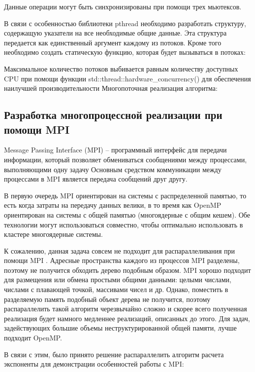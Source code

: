 \documentclass[14pt,a4paper,report]{report}
\begin{document}
Данные операции могут быть синхронизированы при помощи трех мьютексов.

В связи с особенностью библиотеки pthread необходимо разработать структуру, содержащую указатели на все необходимые общие данные. Эта структура передается как единственный аргумент каждому из потоков. Кроме того необходимо создать статическую функцию, которая будет вызываться в потоках:



Максимальное количество потоков выбивается равным количеству доступных CPU при помощи функции std::thread::hardware\_concurrency() для  обеспечения наилучшей производительности \cite{cite-best-thread-count} Многопоточная реализация алгоритма:



\subsection{Разработка многопроцессной реализации при помощи MPI}

Message Passing Interface (MPI) -- программный интерфейс для передачи информации, который позволяет обмениваться сообщениями между процессами, выполняющими одну задачу \cite{cite-mpi} Основным средством коммуникации между процессами в MPI является передача сообщений друг другу.

В первую очередь MPI ориентирован на системы с распределенной памятью, то есть когда затраты на передачу данных велики, в то время как OpenMP ориентирован на системы с общей памятью (многоядерные с общим кешем). Обе технологии могут использоваться совместно, чтобы оптимально использовать в кластере многоядерные системы.

К сожалению, данная задача совсем не подходит для распараллеливания при помощи MPI \cite{cite-tree-traversal-mpi}. Адресные пространства каждого из процессов MPI разделены, поэтому не получится обходить дерево подобным образом. MPI хорошо подходит для размещения или обмена простыми общими данными: целыми числами, числами с плавающей точкой, массивами чисел и др. Однако, поместить в разделяемую память подобный объект дерева не получится, поэтому распараллелить такой алгоритм черезвычайно сложно и скорее всего полученная реализация будет намного медленнее реализаций, описанных до этого. Для задач, задействующих большие объемы неструктурированной общей памяти, лучше подходит OpenMP.

В связи с этим, было принято решение распараллелить алгоритм расчета экспоненты для демонстрации особенностей работы с MPI:
\end{document}

